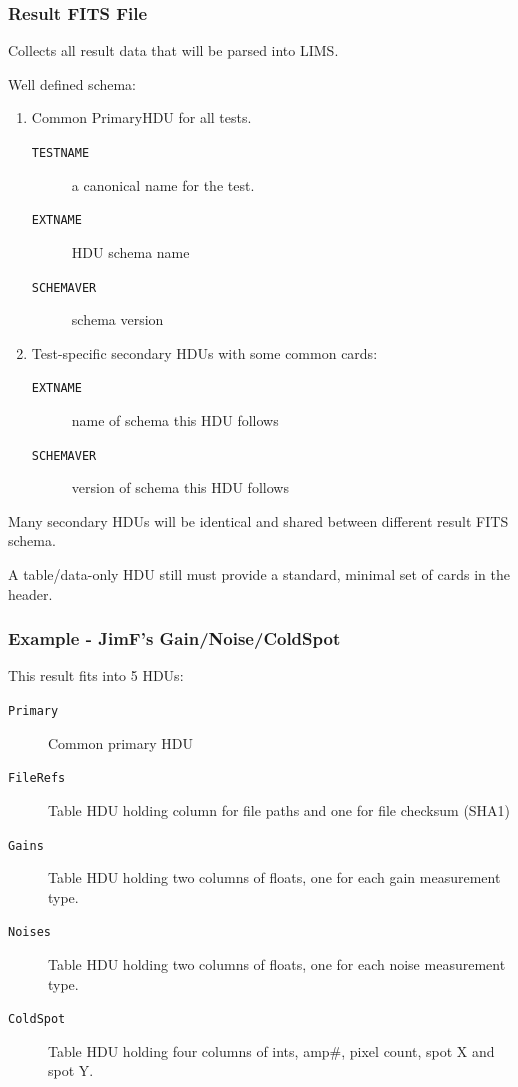 \documentclass[bigger]{beamer}
\begin{document}
\begin{frame}
  \frametitle{Result FITS File}
  Collects all result data that will be parsed into LIMS.

  Well defined schema:
  \begin{enumerate}
  \item Common PrimaryHDU for all tests.
    \begin{description}
    \item[\texttt{TESTNAME}] a canonical name for the test.
    \item[\texttt{EXTNAME}] HDU schema name
    \item[\texttt{SCHEMAVER}] schema version
    \end{description}
  \item Test-specific secondary HDUs with some common cards:
    \begin{description}
    \item[\texttt{EXTNAME}] name of schema this HDU follows
    \item[\texttt{SCHEMAVER}] version of schema this HDU follows
    \end{description}
  \end{enumerate}

  Many secondary HDUs will be identical and shared between different
  result FITS schema.

  A table/data-only HDU still must provide a standard, minimal set of
  cards in the header.
\end{frame}

\begin{frame}
  \frametitle{Example - JimF's Gain/Noise/ColdSpot}
  This result fits into 5 HDUs:
  \begin{description}
  \item[\texttt{Primary}] Common primary HDU
  \item[\texttt{FileRefs}] Table HDU holding column for file paths and
    one for file checksum (SHA1)
  \item[\texttt{Gains}] Table HDU holding two columns of floats, one
    for each gain measurement type.
  \item[\texttt{Noises}] Table HDU holding two columns of floats, one
    for each noise measurement type.
  \item[\texttt{ColdSpot}] Table HDU holding four columns of ints,
    amp\#, pixel count, spot X and spot Y.
  \end{description}

\end{frame}
\end{document}
